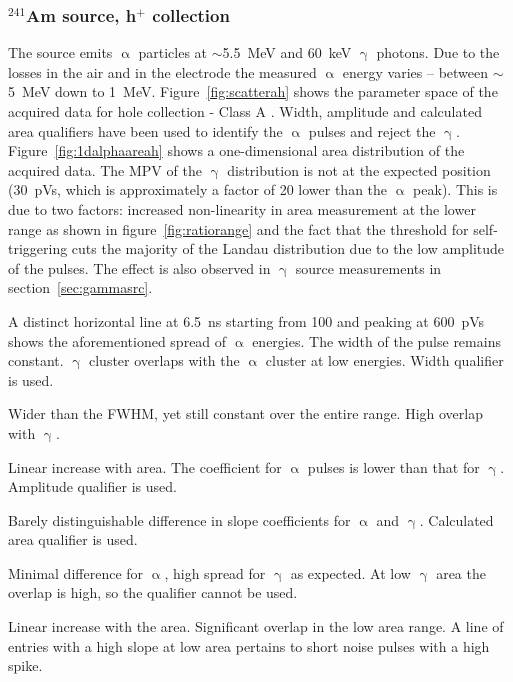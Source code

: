 \clearpage
\subsubsection{$^{241}$Am source, h$^+$ collection}
\label{sec:amsrch}
The source emits $\upalpha$ particles at $\sim$5.5~MeV and 60~keV $\upgamma$ photons. Due to the losses in the air and in the electrode the measured $\upalpha$ energy varies -- between $\sim$5~MeV down to 1~MeV.  Figure~\ref{fig:scatterah} shows the parameter space of the acquired data for hole collection - Class A . Width, amplitude and calculated area qualifiers have been used to identify the $\upalpha$ pulses and reject the $\upgamma$. Figure~\ref{fig:1dalphaareah} shows a one-dimensional area distribution of the acquired data. The MPV of the $\upgamma$ distribution is not at the expected position (30~pVs, which is approximately a factor of 20 lower than the $\upalpha$ peak). This is due to two factors: increased non-linearity in area measurement at the lower range as shown in figure~\ref{fig:ratiorange} and the fact that the threshold for self-triggering cuts the majority of the Landau distribution due to the low amplitude of the pulses. The effect is also observed in $\upgamma$ source measurements in section~\ref{sec:gammasrc}.
\begin{description}
\setlength\itemsep{-0.3em}
\item[Width: ] A distinct horizontal line at 6.5~ns starting from 100 and peaking at 600~pVs shows the aforementioned spread of $\upalpha$ energies. The width of the pulse remains constant. $\upgamma$ cluster overlaps with the $\upalpha$ cluster at low energies. Width qualifier is used.
\item[Base width: ] Wider than the FWHM, yet still constant over the entire range. High overlap with $\upgamma$.
\item[Amplitude: ] Linear increase with area. The coefficient for $\upalpha$ pulses is lower than that for $\upgamma$. Amplitude qualifier is used.
\item[Calculated area: ] Barely distinguishable difference in slope coefficients for $\upalpha$ and $\upgamma$. Calculated area qualifier is used.
\item[Base width -- width: ] Minimal difference for $\upalpha$, high spread for $\upgamma$ as expected. At low $\upgamma$ area the overlap is high, so the qualifier cannot be used.
\item[Slope: ] Linear increase with the area. Significant overlap in the low area range. A line of entries with a high slope at low area pertains to short noise pulses with a high spike.
\end{description}
